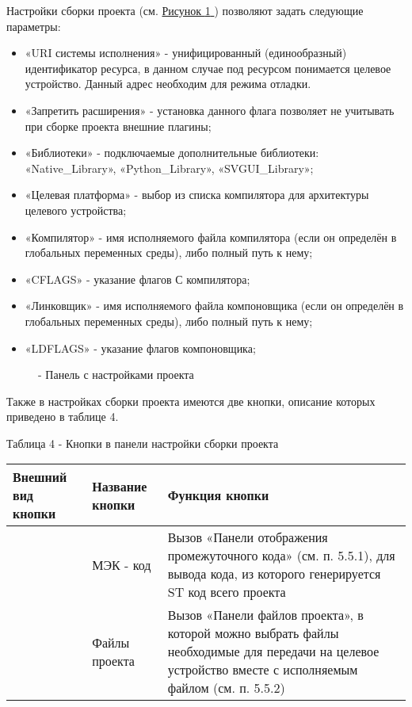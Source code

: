 \documentclass[letterpaper,10pt,russian]{sphinxmanual}
\begin{document}
Настройки сборки проекта (см. \hyperref[usage_guide/ide_components:image41]{Рисунок \ref{usage_guide/ide_components:image41} }) позволяют задать следующие
параметры:
\begin{itemize}
\item {} 
«URI системы исполнения» - унифицированный (единообразный)
идентификатор ресурса, в данном случае под ресурсом понимается
целевое устройство. Данный адрес необходим для режима отладки.

\item {} 
«Запретить расширения» - установка данного флага позволяет не
учитывать при сборке проекта внешние плагины;

\item {} 
«Библиотеки» - подключаемые дополнительные библиотеки:
«Native\_Library», «Python\_Library», «SVGUI\_Library»;

\item {} 
«Целевая платформа» - выбор из списка компилятора для архитектуры
целевого устройства;

\item {} 
«Компилятор» - имя исполняемого файла компилятора (если он определён
в глобальных переменных среды), либо полный путь к нему;

\item {} 
«CFLAGS» - указание флагов С компилятора;

\item {} 
«Линковщик» - имя исполняемого файла компоновщика (если он определён
в глобальных переменных среды), либо полный путь к нему;

\item {} 
«LDFLAGS» - указание флагов компоновщика;

\end{itemize}
\begin{figure}[htbp]
\centering
\capstart

\noindent{}
\caption{- Панель с настройками проекта}\label{usage_guide/ide_components:image41}\end{figure}

Также в настройках сборки проекта имеются две кнопки, описание которых
приведено в таблице 4.

Таблица 4 - Кнопки в панели настройки сборки проекта

\noindent\begin{tabulary}{\linewidth}{|L|L|L|}
\hline
\textsf{\relax 
Внешний вид кнопки
\unskip}\relax &\textsf{\relax 
Название кнопки
\unskip}\relax &\textsf{\relax 
Функция кнопки
\unskip}\relax \\
\hline
{}
&
МЭК - код
&
Вызов «Панели
отображения
промежуточного кода»
(см. п. 5.5.1), для
вывода кода, из
которого генерируется
ST код всего проекта
\\
\hline
{}
&
Файлы проекта
&
Вызов «Панели файлов
проекта», в которой
можно выбрать файлы
необходимые для
передачи на целевое
устройство вместе с
исполняемым файлом
(см. п. 5.5.2)
\\
\hline\end{tabulary}
\end{document}
